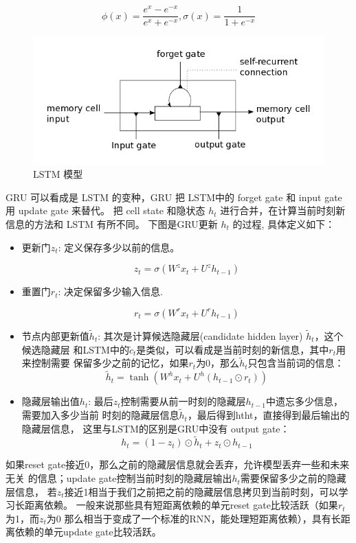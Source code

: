 \documentclass[12pt,a4paper]{article}
\begin{document}
\begin{equation}\label{equ:tanh}
  \phi(x)=\frac{e^x-e^{-x}}{e^x+e^{-x}},\sigma(x)=\frac{1}{1+e^{-x}}
\end{equation}

\begin{figure}
  \centering
  \includegraphics[width=0.9\linewidth]{./figures/lstm_memorycell.png}
  \caption{LSTM 模型}\label{fig:lstm}
\end{figure}


GRU 可以看成是 LSTM 的变种，GRU 把 LSTM中的 forget gate 和 input gate 用 update gate 来替代。 把 cell state 和隐状态 $h_t$ 进行合并，在计算当前时刻新信息的方法和 LSTM 有所不同。 下图是GRU更新 $h_t$ 的过程\cite{DBLP:journals/corr/Pezeshki15}, 具体定义如下：
\begin{itemize}
\item 更新门$z_t$: 定义保存多少以前的信息。

\[z_t = \sigma ( W^z x_t+ U^z h_{t-1}  )\]

\item 重置门$r_t$: 决定保留多少输入信息.

\[r_t = \sigma(W^r x_t  + U^r h_{t-1}  )\]

\item 节点内部更新值$\tilde h_t $: 其次是计算候选隐藏层(candidate hidden layer) $\tilde h_t$，这个候选隐藏层 和LSTM中的$\tilde c_t$是类似，可以看成是当前时刻的新信息，其中$r_t$用来控制需要 保留多少之前的记忆，如果$r_t$为0，那么$\tilde h_t$只包含当前词的信息：
 \[\tilde h_t  = \tanh (W^h x_t  + U^h(h_{t-1} \odot r_t) )\]

\item 隐藏层输出值$h_t$: 最后$z_t$控制需要从前一时刻的隐藏层$h_{t−1}$中遗忘多少信息，需要加入多少当前 时刻的隐藏层信息$\tilde h_t$，最后得到htht，直接得到最后输出的隐藏层信息， 这里与LSTM的区别是GRU中没有 output gate：
\[h_t = (1-z_t)\odot \tilde h_t  + z_t \odot h_{t-1}\]
\end{itemize}
如果reset gate接近0，那么之前的隐藏层信息就会丢弃，允许模型丢弃一些和未来无关 的信息；update gate控制当前时刻的隐藏层输出$h_t$需要保留多少之前的隐藏层信息， 若$z_t$接近1相当于我们之前把之前的隐藏层信息拷贝到当前时刻，可以学习长距离依赖。 一般来说那些具有短距离依赖的单元reset gate比较活跃（如果$r_t$为1，而$z_t$为$0$ 那么相当于变成了一个标准的RNN，能处理短距离依赖），具有长距离依赖的单元update gate比较活跃。
\end{document}
